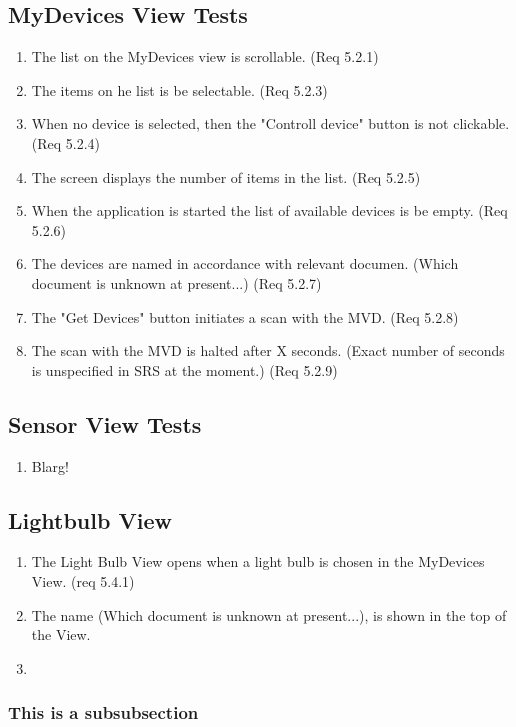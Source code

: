 \documentclass[a4paper]{article}
\newlength{\testlabellength}
\newenvironment{testlist}{\begin{enumerate}[label=\bfseries Test \thesubsection.\arabic* , labelindent=0pt, labelwidth=\testlabellength , leftmargin=2cm]}{\end{enumerate}}
\begin{document}
\begin{appendices}
\subsection{MyDevices View Tests}
\begin{testlist}
	\item The list on the MyDevices view is scrollable. (Req 5.2.1)
    \item The items on he list is be selectable. (Req 5.2.3)
    \item When no device is selected, then the "Controll device" button is not clickable. (Req 5.2.4)
    \item The screen displays the number of items in the list. (Req 5.2.5)
    \item When the application is started the list of available devices is be empty. (Req 5.2.6)
    \item The devices are named in accordance with relevant documen. (Which document is unknown at present...) (Req 5.2.7)
    \item The "Get Devices" button initiates a scan with the MVD. (Req 5.2.8)
    \item The scan with the MVD is halted after X seconds. (Exact number of seconds is unspecified in SRS at the moment.) (Req 5.2.9)
\end{testlist}

\subsection{Sensor View Tests}
\begin{testlist}
\item Blarg!
\end{testlist}

\subsection{Lightbulb View}
\begin{testlist}
	\item The Light Bulb View opens when a light bulb is chosen in the MyDevices View. (req 5.4.1)
    \item The name (Which document is unknown at present...), is shown in the top of the View.
    \item
\end{testlist}	

\subsubsection{This is a subsubsection}


\end{appendices}
\end{document}
